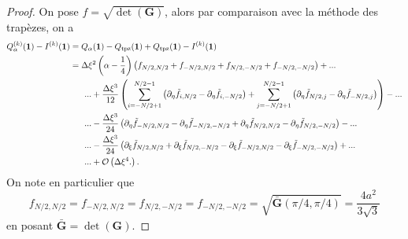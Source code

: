 \begin{proof}
On pose $f = \sqrt{\det(\mathbf{G})}$, alors par comparaison avec la méthode des trapèzes, on a 
\begin{align*}
Q_{\alpha}^{(k)}(\mathbf{1}) - I^{(k)}(\mathbf{1}) & = Q_{\alpha}(\mathbf{1}) - Q_{\text{tpz}}(\mathbf{1}) + Q_{\text{tpz}}(\mathbf{1}) - I^{(k)}(\mathbf{1})\\
	& = \Delta \xi^2 \left( \alpha - \dfrac{1}{4} \right) \left( f_{N/2,N/2} + f_{-N/2,N/2}+ f_{N/2,-N/2}+ f_{-N/2,-N/2} \right) + ...\\
	& \hspace{.6cm} ... + \dfrac{\Delta \xi^3}{12} \left( \displaystyle\sum\limits_{i=-N/2+1}^{N/2-1} \left( \partial_{\eta}\tilde{f}_{i, N/2} - \partial_{\eta}\tilde{f}_{i, -N/2} \right) + \displaystyle\sum\limits_{j=-N/2+1}^{N/2-1} \left( \partial_{\eta}\tilde{f}_{N/2,j} - \partial_{\eta}\tilde{f}_{-N/2,j} \right) \right) - ...  \\
	&  \hspace{.6cm}... - \dfrac{\Delta \xi^3}{24} \left( \partial_{\eta}\tilde{f}_{-N/2,N/2} - \partial_{\eta}\tilde{f}_{-N/2,-N/2} + \partial_{\eta}\tilde{f}_{N/2,N/2}  - \partial_{\eta}\tilde{f}_{N/2,-N/2} \right) - ...  \\
& \hspace{.6cm}... - \dfrac{\Delta \xi^3}{24} \left( \partial_{\xi}\tilde{f}_{N/2,N/2} + \partial_{\xi}\tilde{f}_{N/2,-N/2} - \partial_{\xi}\tilde{f}_{-N/2,N/2}  - \partial_{\xi}\tilde{f}_{-N/2,-N/2} \right)+...\\
& \hspace{.6cm}... + \mathcal{O} \left( \Delta \xi^4. \right).
\end{align*}
On note en particulier que 
\begin{equation}
f_{N/2,N/2} = f_{-N/2,N/2} = f_{N/2,-N/2} = f_{-N/2,-N/2} = \sqrt{\bar{\mathbf{G}}(\pi/4,\pi/4)} = \dfrac{4a^2}{3 \sqrt{3}} 
\end{equation}
en posant $\bar{\mathbf{G}} = \det (\mathbf{G})$.


\end{proof}
